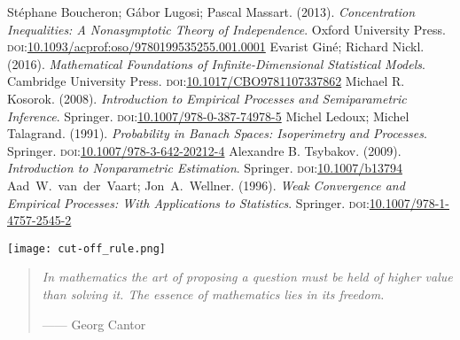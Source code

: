 \documentclass[11pt, a3paper, openany]{article}
\theoremstyle{remark}
\theoremstyle{remark}
\theoremstyle{remark}
\newenvironment{Proof of claim}
  {\begin{proof}[\normalfont \textbf{Proof of claim}]}
  {\end{proof}}
\theoremstyle{definition}
\theoremstyle{remark}
\theoremstyle{plain}
\begin{document}
\begin{thebibliography}{}
{\small
 St\'{e}phane Boucheron; G\'{a}bor Lugosi; Pascal Massart. (2013). \emph{Concentration Inequalities: A Nonasymptotic Theory of Independence}. Oxford University Press. \textsc{doi}:\href{https://doi.org/10.1093/acprof:oso/9780199535255.001.0001}{10.1093/acprof:oso/9780199535255.001.0001}
 Evarist Gin\'{e}; Richard Nickl. (2016). \emph{Mathematical Foundations of Infinite-Dimensional Statistical Models}. Cambridge University Press. \textsc{doi}:\href{https://doi.org/10.1017/CBO9781107337862}{10.1017/CBO9781107337862}
 Michael R. Kosorok. (2008). \emph{Introduction to Empirical Processes and Semiparametric Inference}. Springer. \textsc{doi}:\href{https://doi.org/10.1007/978-0-387-74978-5}{10.1007/978-0-387-74978-5}
 Michel Ledoux; Michel Talagrand. (1991). \emph{Probability in Banach Spaces: Isoperimetry and Processes}. Springer. \textsc{doi}:\href{https://doi.org/10.1007/978-3-642-20212-4}{10.1007/978-3-642-20212-4}
 Alexandre B. Tsybakov. (2009). \emph{Introduction to Nonparametric Estimation}. Springer. \textsc{doi}:\href{https://doi.org/10.1007/b13794}{10.1007/b13794}
 Aad~W.~van~der~Vaart; Jon~A.~Wellner. (1996). \emph{Weak Convergence and Empirical Processes: With Applications to Statistics}. Springer. \textsc{doi}:\href{https://doi.org/10.1007/978-1-4757-2545-2}{10.1007/978-1-4757-2545-2}
}
\end{thebibliography}

\begingroup
\renewcommand{\color}[1]{}
\listoffigures
\endgroup
\vspace{3ex}
\begin{center}
	\texttt{[image: cut-off\_rule.png]}
\end{center}
\vspace{1ex}
\begin{quotation}
	\textsl{In mathematics the art of proposing a question must be held of higher value than solving it. The essence of mathematics lies in its freedom.}
	
\hfill ------ Georg Cantor
\end{quotation}
\end{document}
